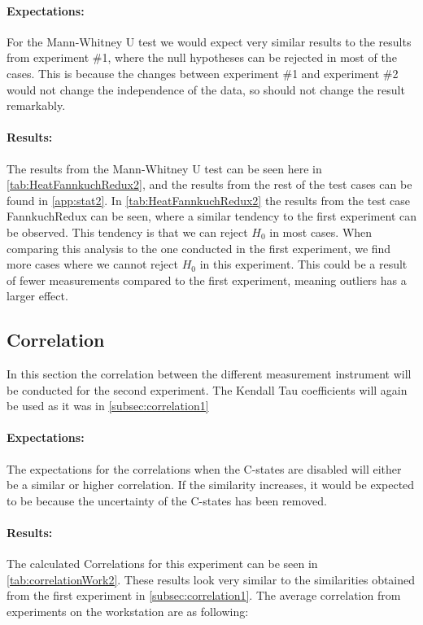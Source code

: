 \paragraph{Expectations:} For the Mann-Whitney U test we would expect very similar results to the results from experiment \#1, where the null hypotheses can be rejected in most of the cases. This is because the changes between experiment \#1 and experiment \#2 would not change the independence of the data, so should not change the result remarkably.



\paragraph{Results:} The results from the Mann-Whitney U test can be seen here in \cref{tab:HeatFannkuchRedux2}, and the results from the rest of the test cases can be found in \cref{app:stat2}. In \cref{tab:HeatFannkuchRedux2} the results from the test case FannkuchRedux can be seen, where a similar tendency to the first experiment can be observed. This tendency is that we can reject $H_0$ in most cases. When comparing this analysis to the one conducted in the first experiment, we find more cases where we cannot reject $H_0$ in this experiment. This could be a result of fewer measurements compared to the first experiment, meaning outliers has a larger effect.

\subsection{Correlation}\label{subsec:correlation2}
In this section the correlation between the different measurement instrument will be conducted for the second experiment. The Kendall Tau coefficients\cite{kendall1938new} will again be used as it was in \cref{subsec:correlation1}

\paragraph{Expectations:} The expectations for the correlations when the C-states are disabled will either be a similar or higher correlation. If the similarity increases, it would be expected to be because the uncertainty of the C-states has been removed.



\paragraph{Results:} The calculated Correlations for this experiment can be seen in \cref{tab:correlationWork2}. These results look very similar to the similarities obtained from the first experiment in \cref{subsec:correlation1}. The average correlation from experiments on the workstation are as following:

